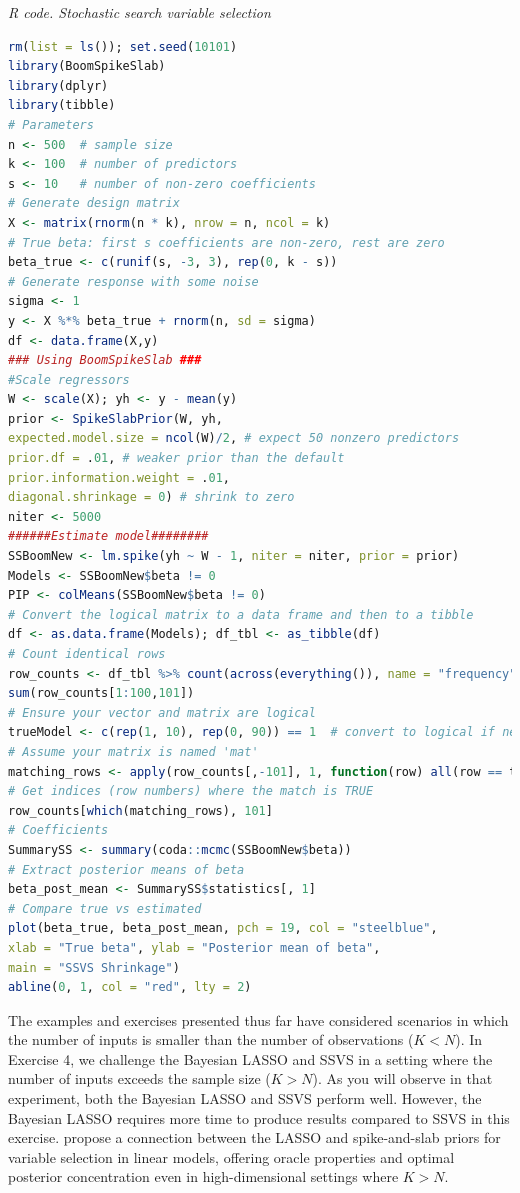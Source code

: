 \begin{tcolorbox}[enhanced,width=4.67in,center upper,
	fontupper=\large\bfseries,drop shadow southwest,sharp corners]
	\textit{R code. Stochastic search variable selection}
	\begin{VF}
		\begin{lstlisting}[language=R]
rm(list = ls()); set.seed(10101)
library(BoomSpikeSlab)
library(dplyr)
library(tibble)
# Parameters
n <- 500  # sample size
k <- 100  # number of predictors
s <- 10   # number of non-zero coefficients
# Generate design matrix
X <- matrix(rnorm(n * k), nrow = n, ncol = k)
# True beta: first s coefficients are non-zero, rest are zero
beta_true <- c(runif(s, -3, 3), rep(0, k - s))
# Generate response with some noise
sigma <- 1
y <- X %*% beta_true + rnorm(n, sd = sigma)
df <- data.frame(X,y)
### Using BoomSpikeSlab ###
#Scale regressors
W <- scale(X); yh <- y - mean(y)
prior <- SpikeSlabPrior(W, yh, 
expected.model.size = ncol(W)/2, # expect 50 nonzero predictors
prior.df = .01, # weaker prior than the default
prior.information.weight = .01,
diagonal.shrinkage = 0) # shrink to zero
niter <- 5000
######Estimate model########
SSBoomNew <- lm.spike(yh ~ W - 1, niter = niter, prior = prior)
Models <- SSBoomNew$beta != 0
PIP <- colMeans(SSBoomNew$beta != 0)
# Convert the logical matrix to a data frame and then to a tibble
df <- as.data.frame(Models); df_tbl <- as_tibble(df)
# Count identical rows
row_counts <- df_tbl %>% count(across(everything()), name = "frequency") %>% arrange(desc(frequency))
sum(row_counts[1:100,101])
# Ensure your vector and matrix are logical
trueModel <- c(rep(1, 10), rep(0, 90)) == 1  # convert to logical if needed
# Assume your matrix is named 'mat'
matching_rows <- apply(row_counts[,-101], 1, function(row) all(row == trueModel))
# Get indices (row numbers) where the match is TRUE
row_counts[which(matching_rows), 101]
# Coefficients
SummarySS <- summary(coda::mcmc(SSBoomNew$beta))
# Extract posterior means of beta
beta_post_mean <- SummarySS$statistics[, 1]
# Compare true vs estimated
plot(beta_true, beta_post_mean, pch = 19, col = "steelblue",
xlab = "True beta", ylab = "Posterior mean of beta",
main = "SSVS Shrinkage")
abline(0, 1, col = "red", lty = 2)
\end{lstlisting}
	\end{VF}
\end{tcolorbox}

The examples and exercises presented thus far have considered scenarios in which the number of inputs is smaller than the number of observations ($K < N$). In Exercise 4, we challenge the Bayesian LASSO and SSVS in a setting where the number of inputs exceeds the sample size ($K > N$). As you will observe in that experiment, both the Bayesian LASSO and SSVS perform well. However, the Bayesian LASSO requires more time to produce results compared to SSVS in this exercise. \cite{rockova2018spike} propose a connection between the LASSO and spike-and-slab priors for variable selection in linear models, offering oracle properties and optimal posterior concentration even in high-dimensional settings where $K > N$.

